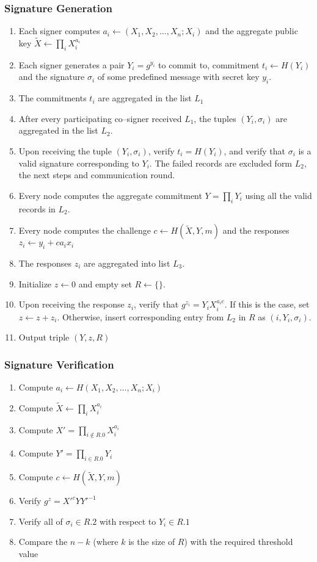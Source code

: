 \subsubsection{Signature Generation}
\begin{enumerate}
    \item Each signer computes $a_i\leftarrow(X_1,X_2,\dots,X_n;X_i)$ and the aggregate public key $\tilde{X}\leftarrow\prod_i X_i^{a_i}$
    \item Each signer generates a pair $Y_i=g^{y_i}$ to commit to, commitment $t_i\leftarrow H(Y_i)$ and the signature $\sigma_i$ of
        some predefined message with secret key $y_i$.
    \item The commitments $t_i$ are aggregated in the list $L_1$
    \item After every participating co--signer received $L_1$, the tuples $(Y_i,\sigma_i)$ are aggregated in the list
        $L_2$.
    \item Upon receiving the tuple $(Y_i,\sigma_i)$, verify $t_i = H(Y_i)$, and verify that $\sigma_i$ is a valid
        signature corresponding to $Y_i$. The failed records are excluded form $L_2$, the next steps and communication round.
    \item Every node computes the aggregate commitment $Y=\prod_i Y_i$ using all the valid records in $L_2$.
    \item Every node computes the challenge $c\leftarrow H(\tilde{X}, Y, m)$ and the responses $z_i\leftarrow y_i + ca_ix_i$
    \item The responses $z_i$ are aggregated into list $L_3$.
    \item Initialize $z\leftarrow 0$ and empty set $R\leftarrow\{\}$.
    \item Upon receiving the response $z_i$, verify that $g^{z_i} = Y_i X_i^{a_ic}$. If this is the case, set $z\leftarrow
        z+z_i$. Otherwise, insert corresponding entry from $L_2$ in $R$ as $(i, Y_i, \sigma_i)$.
    \item Output triple $(Y,z,R)$
\end{enumerate}

\subsubsection{Signature Verification}
\begin{enumerate}
    \item Compute $a_i\leftarrow H(X_1,X_2,\dots,X_n;X_i)$
    \item Compute $\tilde{X}\leftarrow\prod_i X_i^{a_i}$
    \item Compute $X' = \prod_{i\notin R.0}X_i^{a_i}$
    \item Compute $Y' = \prod_{i\in R.0} Y_i$
    \item Compute $c\leftarrow H(\tilde{X}, Y, m)$
    \item Verify $g^z=X'^cYY'^{-1}$
    \item Verify all of $\sigma_i\in R.2$ with respect to $Y_i\in R.1$
    \item Compare the $n-k$ (where $k$ is the size of $R$) with the required threshold value
\end{enumerate}

